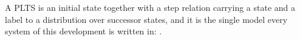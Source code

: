 \begin{definition}
  \label{def:system}
  \leanok
  A PLTS is an initial state together with a step relation carrying a state and a label to a distribution over successor states, and it is the single model every system of this development is written in: .
\end{definition}

